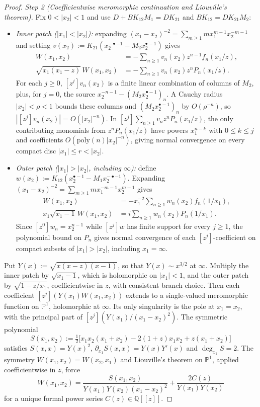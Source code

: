 \documentclass[twoside,10pt]{article}
\numberwithin{equation}{section}
\theoremstyle{slbody}
\theoremstyle{definition}
\theoremstyle{remark}
\begin{document}
\begin{proof}
\emph{Step 2 (Coefficientwise meromorphic continuation and Liouville's theorem).}
Fix \(0<|x_2|<1\) and use \(D+BK_{12}M_1=DK_{21}\) and \(BK_{12}=DK_{21}M_2\):
\begin{itemize}\setlength{\itemsep}{1pt}
\item \emph{Inner patch (\(|x_1|<|x_2|\)):} expanding
  \((x_1-x_2)^{-2}=\sum_{m\geq1}mx_1^{m-1}x_2^{-m-1}\) and setting
  \(v(x_2):=K_{21}(x_2^{-\bullet-1}-M_2x_2^{\bullet-1})\) gives
  \begin{align*}
   W(x_1,x_2)&=-\sum_{n\geq1}v_n(x_2)z^{n-1}f_n(x_1/z),\\
   \sqrt{x_1(x_1-z)}\,W(x_1,x_2)&=-\sum_{n\geq1}v_n(x_2)z^nP_n(x_1/z).
  \end{align*}
  For each \(j\geq0\), \([z^j]v_n(x_2)\) is a finite linear combination of
  columns of \(M_2\), plus, for \(j=0\), the source
  \(x_2^{-n-1}-(M_2x_2^{\bullet-1})_n\).  A Cauchy radius
  \(|x_2|<\rho<1\) bounds these columns and \((M_2x_2^{\bullet-1})_n\) by
  \(O(\rho^{-n})\), so \(|[z^j]v_n(x_2)|=O(|x_2|^{-n})\).  In
  \([z^j]\sum_{n\geq1}v_n z^n P_n(x_1/z)\), the only contributing monomials
  from \(z^nP_n(x_1/z)\) have powers \(x_1^{n-k}\) with \(0\leq k\leq j\) and
  coefficients \(O(\mathrm{poly}(n)|x_2|^{-n})\), giving normal convergence
  on every compact disc \(|x_1|\leq r<|x_2|\).
\item \emph{Outer patch (\(|x_1|>|x_2|\), including \(\infty\)):} define
  \(w(x_2):=K_{12}(x_2^{\bullet-1}-M_1x_2^{-\bullet-1})\).  Expanding
  \((x_1-x_2)^{-2}=\sum_{m\geq1}mx_1^{-m-1}x_2^{m-1}\) gives
  \begin{align*}
   W(x_1,x_2)&=-x_1^{-2}\sum_{n\geq1}w_n(x_2)f_n(1/x_1),\\
   x_1\sqrt{x_1-1}\,W(x_1,x_2)&=i\sum_{n\geq1}w_n(x_2)P_n(1/x_1).
  \end{align*}
  Since
  \([z^0]w_n=x_2^{n-1}\) while \([z^j]w\) has finite support for every
  \(j\geq1\), the polynomial bound on \(P_n\) gives normal convergence of each
  \([z^j]\)-coefficient on compact subsets of \(|x_1|>|x_2|\), including
  \(x_1=\infty\).
\end{itemize}
Put \(Y(x):=\sqrt{x(x-z)(x-1)}\), so that \(Y(x)\sim x^{3/2}\) at \(\infty\).
Multiply the inner patch by \(\sqrt{x_1-1}\), which is holomorphic on
\(|x_1|<1\), and the outer patch by \(\sqrt{1-z/x_1}\), coefficientwise in
\(z\), with consistent branch choice.  Then each coefficient
\([z^j](Y(x_1)W(x_1,x_2))\) extends to a single-valued meromorphic function on
\(\mathbb P^1\), holomorphic at \(\infty\).  Its only singularity is the pole at
\(x_1=x_2\), with the principal part of \([z^j](Y(x_1)/(x_1-x_2)^2)\).  The
symmetric polynomial
\[
 S(x_1,x_2):=\tfrac12\bigl[x_1x_2(x_1+x_2)-2(1+z)x_1x_2+z(x_1+x_2)\bigr]
\]
satisfies \(S(x,x)=Y(x)^2\), \(\partial_{x_1}S(x,x)=Y(x)Y'(x)\) and
\(\deg_{x_1}S=2\).  The symmetry \(W(x_1,x_2)=W(x_2,x_1)\) and Liouville's
theorem on \(\mathbb P^1\), applied coefficientwise in \(z\), force
\[
 W(x_1,x_2)=\frac{S(x_1,x_2)}{Y(x_1)Y(x_2)(x_1-x_2)^2}+\frac{2C(z)}{Y(x_1)Y(x_2)}
\]
for a unique formal power series \(C(z)\in\mathbb Q[[z]]\).


\end{proof}
\end{document}
